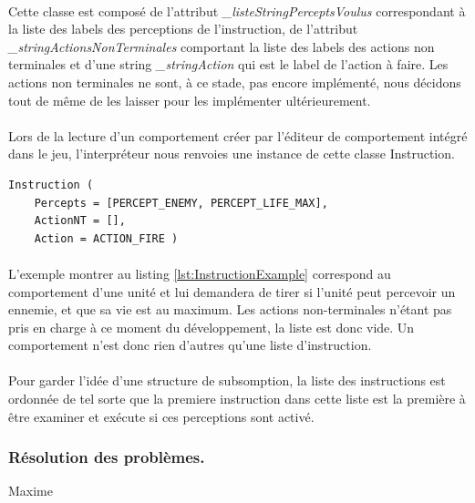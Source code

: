 \documentclass{report}
\begin{document}
\paragraph{}Cette classe est composé de l'attribut \textit{\_listeStringPerceptsVoulus} correspondant à la liste des labels des perceptions de l'instruction, de l'attribut \textit{\_stringActionsNonTerminales} comportant la liste des labels des actions non terminales et d'une string \textit{\_stringAction} qui est le label de l'action à faire. Les actions non terminales ne sont, à ce stade, pas encore implémenté, nous décidons tout de même de les laisser pour les implémenter ultérieurement.
\paragraph{}Lors de la lecture d'un comportement créer par l'éditeur de comportement intégré dans le jeu, l’interpréteur nous renvoies une instance de cette classe Instruction.

\begin{lstlisting}[label={lst:InstructionExample}, caption=  Exemple d'une instruction d'un comportement que peut renvoyer l’interpréteur.]
Instruction (
	Percepts = [PERCEPT_ENEMY, PERCEPT_LIFE_MAX],
	ActionNT = [],
	Action = ACTION_FIRE )
\end{lstlisting}

\paragraph{}L'exemple montrer au listing \ref{lst:InstructionExample} correspond au comportement d'une unité et lui demandera de tirer si l'unité peut percevoir un ennemie, et que sa vie est au maximum. Les actions non-terminales n'étant pas pris en charge à ce moment du développement, la liste est donc vide. Un comportement n'est donc rien d'autres qu'une liste d'instruction.
\paragraph{}Pour garder l'idée d'une structure de subsomption, la liste des instructions est ordonnée de tel sorte que la premiere instruction dans cette liste est la première à être examiner et exécute si ces perceptions sont activé.



\subsubsection{Résolution des problèmes.} Maxime
\end{document}
